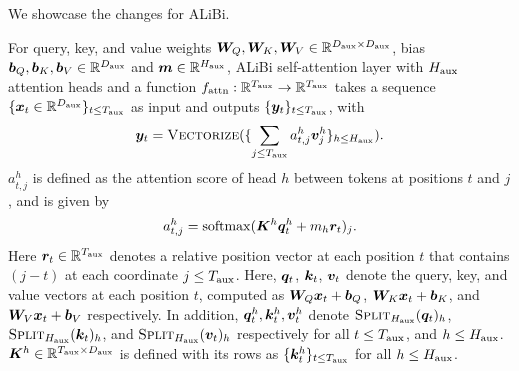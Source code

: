 We showcase the changes for ALiBi.
\begin{definition}\label{def:self-attn_alibi}
    For query, key, and value weights ${\bm{W}}_Q, {\bm{W}}_K, {\bm{W}}_V \in\mathbb{R}^{D_{\text{aux}}\times D_{\text{aux}}}$, bias ${\bm{b}}_{Q}, {\bm{b}}_{K}, {\bm{b}}_{V} \in\mathbb{R}^{D_{\text{aux}}}$ and ${\bm{m}} \in \mathbb{R}^{H_{\text{aux}}}$, ALiBi self-attention layer with $H_{\text{aux}}$ attention heads and a function $f_{\mathrm{attn}}: \mathbb{R}^{T_{\text{aux}}} \to \mathbb{R}^{T_{\text{aux}}}$ takes a sequence $\{{\bm{x}}_t\in\mathbb{R}^{D_{\text{aux}}}\}_{t \le T_{\text{aux}}}$ as input and outputs $\{ {\bm{y}}_t \}_{t \le T_{\text{aux}}}$, with 
    \begin{align}
        {\bm{y}}_t = \textsc{Vectorize} ( \{ \sum_{j \le T_{\text{aux}}} a^h_{t, j}  {\bm{v}}^{h}_j  \}_{h \le H_{\text{aux}}} ).  \label{eq:attnt_forward_alibi}
    \end{align}
    $a^{h}_{t, j}$ is defined as the attention score of head $h$ between tokens at positions $t$ and $j$, and is given by
    \begin{align} \label{eq:attn_alibi}
        a^h_{t, j} =  \mathrm{softmax} ( {\bm{K}}^{h} {\bm{q}}^{h}_t + m_h {\bm{r}}_t )_j.
    \end{align}
    Here ${\bm{r}}_t \in \mathbb{R}^{T_{\text{aux}}}$ denotes a relative position vector at each position $t$ that contains $(j - t)$ at each coordinate $j \le T_{\text{aux}}$.
     Here, ${\bm{q}}_t$, ${\bm{k}}_t$, ${\bm{v}}_t$ denote the query, key, and value vectors at each position $t$, computed as ${\bm{W}}_Q {\bm{x}}_t + {\bm{b}}_Q$, ${\bm{W}}_K {\bm{x}}_t + {\bm{b}}_K$, and ${\bm{W}}_V {\bm{x}}_t + {\bm{b}}_V$ respectively. In addition, ${\bm{q}}^{h}_t, {\bm{k}}^{h}_t, {\bm{v}}^{h}_t$ denote $\textsc{Split}_{H_{\text{aux}}} ({\bm{q}}_t)_h$, $\textsc{Split}_{H_{\text{aux}}} ({\bm{k}}_t)_h$, and $\textsc{Split}_{H_{\text{aux}}} ({\bm{v}}_t)_h$ respectively for all $t \le T_{\text{aux}}$, and $h \le H_{\text{aux}}$. 
     ${\bm{K}}^h \in \mathbb{R}^{T_{\text{aux}} \times D_{\text{aux}} }$ is defined with its rows as $\{{\bm{k}}^h_t\}_{t \le T_{\text{aux}}}$ for all $h \le H_{\text{aux}}$.
\end{definition}


